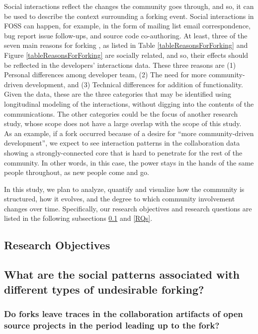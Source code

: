 \documentclass[11pt]{report}
\begin{document}
Social interactions reflect the changes the community goes through, and so, it can be used to describe the context surrounding a forking event. Social interactions in FOSS can happen, for example, in the form of mailing list email correspondence, bug report issue follow-ups, and source code co-authoring. At least, three of the seven main reasons for forking \cite{Robles}, as listed in Table \ref{tableReasonsForForking} and Figure \ref{tableReasonsForForking} are socially related, and so, their effects should be reflected in the developers' interactions data. These three reasons are (1) Personal differences among developer team, (2) The need for more community-driven development, and (3) Technical differences for addition of functionality. Given the data, these are the three categories that may be identified using longitudinal modeling of the interactions, without digging into the contents of the communications. The other categories could be the focus of another research study, whose scope does not have a large overlap with the scope of this study. \\
As an example, if a fork occurred because of a desire for ``more community-driven development'', we expect to see interaction patterns in the collaboration data showing a strongly-connected core that is hard to penetrate for the rest of the community. In other words, in this case, the power stays in the hands of the same people throughout, as new people come and go. 

In this study, we plan to analyze, quantify and visualize how the community is structured, how it evolves, and the degree to which community involvement changes over time.
Specifically, our research objectives and research questions are listed in the following subsections \ref{ResearchObjective} and \ref{RQs}.

\subsection{Research Objectives}
\label{ResearchObjective}
\subsection*{What are the social patterns associated with different types of undesirable forking?\\}

\subsubsection{\hspace{4 mm} Do forks leave traces in the collaboration artifacts of open source projects in the period leading up to the fork?\\}
\end{document}
